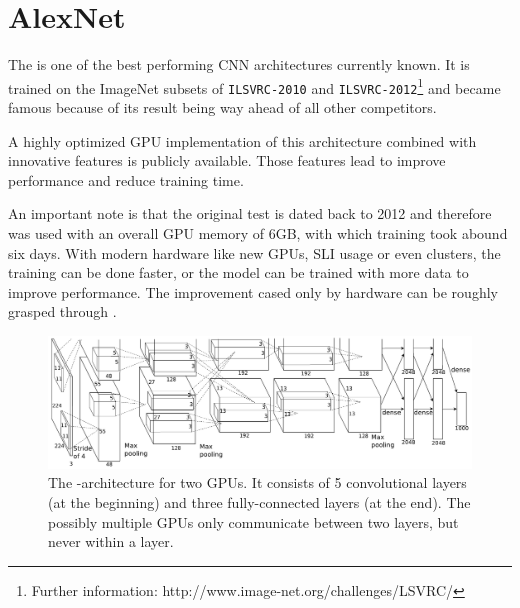 
\section{AlexNet} \label{sec: AlexNet}

The \textit{\alexnet} is one of the best performing CNN architectures currently known. It is trained on the ImageNet subsets of \texttt{ILSVRC-2010} and \texttt{ILSVRC-2012}\footnote{Further information: http://www.image-net.org/challenges/LSVRC/} and became famous because of its result being way ahead of all other competitors.

A highly optimized GPU implementation of this architecture combined with innovative features is publicly available. Those features lead to improve performance and reduce training time.\cite{krizhevsky2012imagenet}

An important note is that the original test is dated back to 2012 and therefore was used with an overall GPU memory of 6GB, with which training took abound six days. With modern hardware like new GPUs, SLI usage or even clusters, the training can be done faster, or the model can be trained with more data to improve performance. The improvement cased only by hardware can be roughly grasped through \cite{sze2017hardware}.


\begin{figure}[ht]
	\includegraphics[scale = 0.5]{src/pic/AlexNet-structure.PNG}
	\caption{The \alexnet-architecture for two GPUs. It consists of 5 convolutional layers (at the beginning) and three fully-connected layers (at the end). The possibly multiple GPUs only communicate between two layers, but never within a layer.\cite{krizhevsky2012imagenet}}
	\label{pic: AlexNet}
\end{figure}